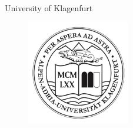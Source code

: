 \thispagestyle{empty}


\begin{verbatim}


\end{verbatim}

\begin{center}
\Large{University of Klagenfurt}\\
\end{center}


\begin{figure}[H]
 \centering
 \includegraphics[width=0.4\textwidth]{abb/logo_aau}
\end{figure}

